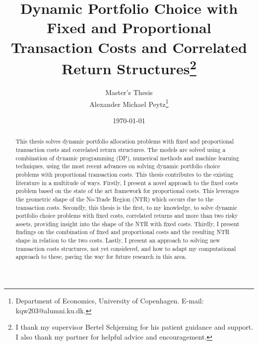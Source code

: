 \documentclass[11pt]{article}
\author{Master's Thesis\\
	Alexander Michael Peytz\footnote{Department of Economics, University of Copenhagen. E-mail: kqw203@alumni.ku.dk.}}
\title{Dynamic Portfolio Choice with Fixed and Proportional Transaction Costs and Correlated Return Structures\footnote{I thank my supervisor Bertel Schjerning for his patient guidance and support.
I also thank my partner for helpful advice and encouragement.}}
\date{\today}
\begin{document}
% 


\clearpage
\setcounter{page}{1}

\maketitle
\renewcommand*{\thefootnote}{\fnsymbol{footnote}}

\begin{abstract}
\noindent This thesis solves dynamic portfolio allocation problems with fixed and proportional transaction costs
and correlated return structures.
The models are solved using a combination of dynamic programming (DP), numerical methods and machine learning techniques,
using the most recent advances on solving dynamic portfolio choice problems with proportional transaction costs.
This thesis contributes to the existing literature in a multitude of ways. Firstly, I present a novel approach to the fixed costs problem
based on the state of the art framework for proportional costs.
This leverages the geometric shape of the No-Trade Region (NTR) which occurs due to the transaction costs.
Secondly, this thesis is the first, to my knowledge, to solve dynamic portfolio choice problems with fixed costs, correlated returns and more than two risky assets,
providing insight into the shape of the NTR with fixed costs.
Thirdly, I present findings on the combination of fixed and proportional costs and the resulting NTR shape in relation to the two costs.
Lastly, I present an approach to solving new transaction costs structures, not yet considered, and how to adapt my computational approach to these,
paving the way for future research in this area.
\end{abstract}

\newpage
\begingroup 
  \hypersetup{linkcolor=black}
  \tableofcontents
  \newpage
  \listoffigures
  \listoftables
  \printacronyms[sort=true, template=tabular, display=used]  
\endgroup
\newpage
\end{document}
